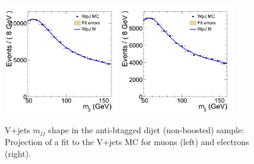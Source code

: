 \begin{figure}
\begin{center}
\includegraphics[width=0.45\textwidth]{figs/wpj/Dibosonlnujj_WpJ_muon_2jets.png}
\includegraphics[width=0.45\textwidth]{figs/wpj/Dibosonlnujj_WpJ_electron_2jets.png}
\end{center}
\caption{\label{fig:WpJFit} V+jets $m_{jj}$ shape in the anti-btagged dijet (non-boosted) sample:
Projection of a fit to the V+jets MC for muons (left) and electrons (right).}
\label{fig:WpJFit_Dijet}
\end{figure}
